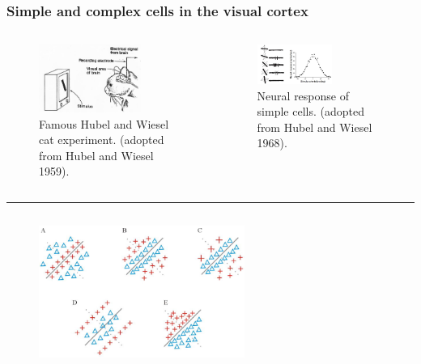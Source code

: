 \documentclass[a4paper,9pt]{beamer}
\theoremstyle{mytheoremstyle}
\begin{document}
\begin{frame}
\frametitle{Simple and complex cells in the visual cortex}
\begin{columns}
\begin{figure}
\begin{center}
  \includegraphics[width=0.75\textwidth]{res/hubel-experiment-cat.png}
\end{center}
	\caption{Famous Hubel and Wiesel cat experiment. (adopted from Hubel and Wiesel 1959).}
\end{figure}
\vspace{0.8cm}
\begin{figure}
\begin{center}
  \includegraphics[width=0.6\textwidth]{res/hubel-experiment-cat-2.png}
\end{center}
	\caption{Neural response of simple cells. (adopted from Hubel and Wiesel 1968).}
\end{figure}
\end{columns}
\hrule
\begin{columns}
\begin{figure}
\begin{center}
  \includegraphics[width=0.6\textwidth]{res/simple_cells.png}

\end{center}
\end{figure}
\end{columns}
\end{frame}
\end{document}
